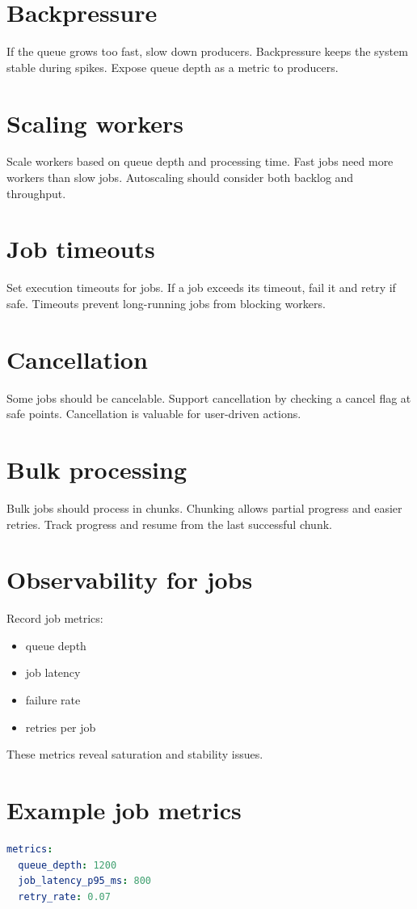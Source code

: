 \section{Backpressure}
If the queue grows too fast, slow down producers.
Backpressure keeps the system stable during spikes.
Expose queue depth as a metric to producers.

\section{Scaling workers}
Scale workers based on queue depth and processing time.
Fast jobs need more workers than slow jobs.
Autoscaling should consider both backlog and throughput.

\section{Job timeouts}
Set execution timeouts for jobs.
If a job exceeds its timeout, fail it and retry if safe.
Timeouts prevent long-running jobs from blocking workers.

\section{Cancellation}
Some jobs should be cancelable.
Support cancellation by checking a cancel flag at safe points.
Cancellation is valuable for user-driven actions.

\section{Bulk processing}
Bulk jobs should process in chunks.
Chunking allows partial progress and easier retries.
Track progress and resume from the last successful chunk.

\section{Observability for jobs}
Record job metrics:
\begin{itemize}[nosep]
  \item queue depth
  \item job latency
  \item failure rate
  \item retries per job
\end{itemize}
These metrics reveal saturation and stability issues.

\section{Example job metrics}
\begin{lstlisting}[language=YAML]
metrics:
  queue_depth: 1200
  job_latency_p95_ms: 800
  retry_rate: 0.07
\end{lstlisting}

